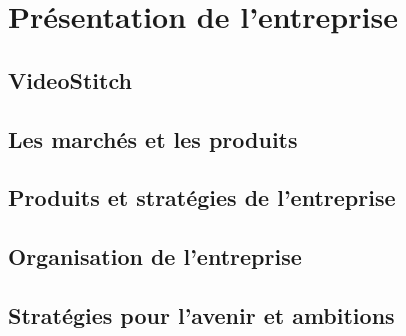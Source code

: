 \chapter{Présentation de l'entreprise}
\section{VideoStitch}

\section{Les marchés et les produits}

\section{Produits et stratégies de l'entreprise}

\section{Organisation de l'entreprise}

\section{Stratégies pour l'avenir et ambitions}
